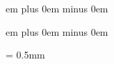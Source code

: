 \newskip\afterclefnospace

\newdimen\additionallineswidth

\newskip\afterinitialshift
{} em plus 0em minus 0em

\newskip\beforeinitialshift
{} em plus 0em minus 0em


\newdimen\aboveinitialseparation
\aboveinitialseparation = 0.5mm

\def\setaboveinitialseparation#1{
\aboveinitialseparation=#1%
\relax %
}

\def\setspaceafterinitial#1{%
\afterinitialshift=#1 %
\relax %
}

\def\setspacebeforeinitial#1{%
\beforeinitialshift=#1 %
\relax %
}

\newskip\clefchangespace

